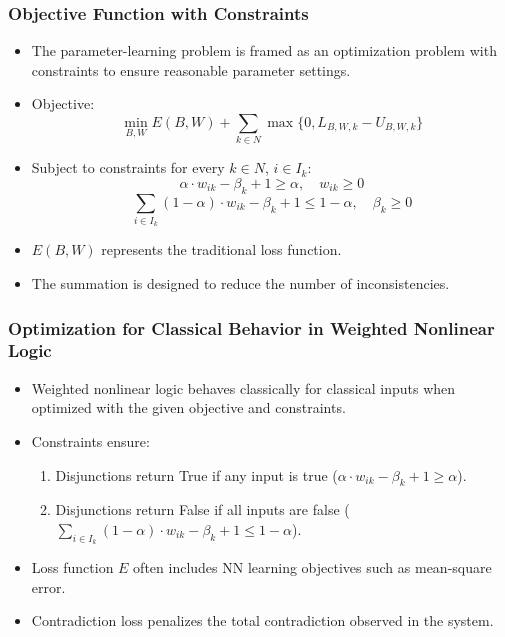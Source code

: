 \documentclass{beamer}
\begin{document}
\begin{frame}
\frametitle{Objective Function with Constraints}
\begin{itemize}
    \item The parameter-learning problem is framed as an optimization
      problem with constraints to ensure reasonable parameter
      settings.
    \item Objective:
    \[ \min_{B,W} E(B, W) + \sum_{k \in N} \max\{0, L_{B,W,k} - U_{B,W,k}\} \]
    \item Subject to constraints for every \(k \in N\), \(i \in I_k\):
    \[ \alpha \cdot w_{ik} - \beta_k + 1 \geq \alpha, \quad w_{ik} \geq 0 \]
    \[ \sum_{i \in I_k} (1 - \alpha) \cdot w_{ik} - \beta_k + 1 \leq 1
      - \alpha, \quad \beta_k \geq 0 \] 
    \item \(E(B,W)\) represents the traditional loss function.
    \item The summation is designed to reduce the number of inconsistencies.
\end{itemize}
\end{frame}

\begin{frame}
\frametitle{Optimization for Classical Behavior in Weighted Nonlinear Logic}
\begin{itemize}
    \item Weighted nonlinear logic behaves classically for classical
      inputs when optimized with the given objective and constraints.
    \item Constraints ensure:
    \begin{enumerate}
        \item Disjunctions return True if any input is true (\( \alpha
          \cdot w_{ik} - \beta_k + 1 \geq \alpha \)).
        \item Disjunctions return False if all inputs are false (\(
          \sum_{i \in I_k} (1 - \alpha) \cdot w_{ik} - \beta_k + 1
          \leq 1 - \alpha \)).
    \end{enumerate}
    \item Loss function \(E\) often includes NN learning objectives
      such as mean-square error.
    \item Contradiction loss penalizes the total contradiction
      observed in the system.
\end{itemize}
\end{frame}
\end{document}

